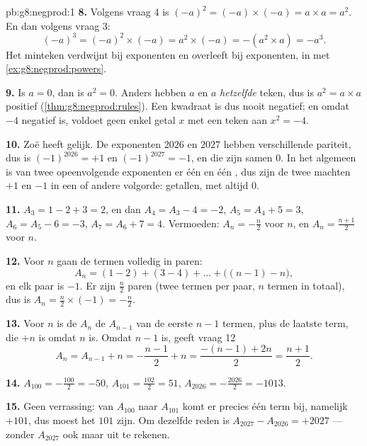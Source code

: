 \begin{solution}{pb:g8:negprod:1}
\textbf{8.} Volgens vraag 4 is $(-a)^2 = (-a) \times (-a) = a \times a = a^2$. En dan
volgens vraag 3:
\[
(-a)^3 = (-a)^2 \times (-a) = a^2 \times (-a) = -(a^2 \times a)
= -a^3 .
\]
Het minteken verdwijnt bij  exponenten en overleeft bij  exponenten, in 
met \cref{ex:g8:negprod:powers}.

\textbf{9.} Is $a = 0$, dan is $a^2 = 0$. Anders hebben $a$ en $a$ \emph{hetzelfde}
teken, dus is $a^2 = a \times a$ positief
(\cref{thm:g8:negprod:rules}). Een kwadraat is dus nooit negatief; en omdat $-4$
negatief is, voldoet geen enkel getal $x$ met een teken aan $x^2 = -4$.

\textbf{10.} Zoë heeft gelijk. De exponenten $2026$ en $2027$ hebben verschillende
pariteit, dus is $(-1)^{2026} = +1$ en $(-1)^{2027} = -1$, en die zijn samen $0$. In het
algemeen is van twee opeenvolgende exponenten er één  en één , dus zijn de
twee machten $+1$ en $-1$ in een of andere volgorde:  getallen, met 
altijd $0$.

\textbf{11.} $A_3 = 1 - 2 + 3 = 2$, en dan $A_4 = A_3 - 4 = -2$,
$A_5 = A_4 + 5 = 3$, $A_6 = A_5 - 6 = -3$, $A_7 = A_6 + 7 = 4$. Vermoeden:
$A_n = -\frac{n}{2}$ voor  $n$, en $A_n = \frac{n+1}{2}$ voor  $n$.

\textbf{12.} Voor  $n$ gaan de termen volledig in paren:
\[
A_n = (1 - 2) + (3 - 4) + \dots + \bigl((n-1) - n\bigr),
\]
en elk paar is $-1$. Er zijn $\frac{n}{2}$ paren (twee termen per paar, $n$ termen in
totaal), dus is $A_n = \frac{n}{2} \times (-1) = -\frac{n}{2}$.

\textbf{13.} Voor  $n$ is de  $A_n$ de  $A_{n-1}$ van de eerste $n - 1$
termen, plus de laatste term, die $+n$ is omdat $n$  is. Omdat $n - 1$  is,
geeft vraag 12
\[
A_n = A_{n-1} + n = -\frac{n-1}{2} + n
= \frac{-(n-1) + 2n}{2} = \frac{n+1}{2} .
\]

\textbf{14.} $A_{100} = -\frac{100}{2} = -50$, \quad
$A_{101} = \frac{102}{2} = 51$, \quad
$A_{2026} = -\frac{2026}{2} = -1013$.

\textbf{15.} Geen verrassing: van $A_{100}$ naar $A_{101}$ komt er precies één term bij,
namelijk $+101$, dus moest het  $101$ zijn. Om dezelfde reden is
$A_{2027} - A_{2026} = +2027$ --- zonder $A_{2027}$ ook maar uit te rekenen.
\end{solution}
